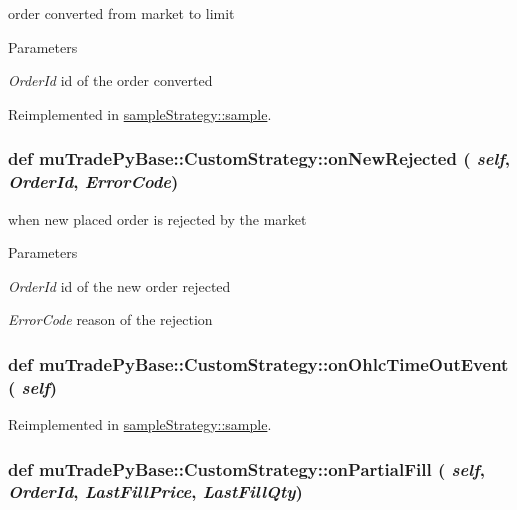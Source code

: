 order converted from market to limit 
\begin{DoxyParams}{Parameters}
\item[{\em OrderId}]id of the order converted \end{DoxyParams}


Reimplemented in \hyperlink{classsampleStrategy_1_1sample_a0dadfb1a2a74b910362bfeb1d5564185}{sampleStrategy::sample}.\hypertarget{classmuTradePyBase_1_1CustomStrategy_a5274ec9bdcddf755f17f2fc0817e4e19}{
\subsubsection[{onNewRejected}]{\setlength{\rightskip}{0pt plus 5cm}def muTradePyBase::CustomStrategy::onNewRejected ( {\em self}, \/   {\em OrderId}, \/   {\em ErrorCode})}}
\label{classmuTradePyBase_1_1CustomStrategy_a5274ec9bdcddf755f17f2fc0817e4e19}


when new placed order is rejected by the market 
\begin{DoxyParams}{Parameters}
\item[{\em OrderId}]id of the new order rejected \item[{\em ErrorCode}]reason of the rejection \end{DoxyParams}
\hypertarget{classmuTradePyBase_1_1CustomStrategy_aa94a2228807baeaab027108dc663675e}{
\subsubsection[{onOhlcTimeOutEvent}]{\setlength{\rightskip}{0pt plus 5cm}def muTradePyBase::CustomStrategy::onOhlcTimeOutEvent ( {\em self})}}
\label{classmuTradePyBase_1_1CustomStrategy_aa94a2228807baeaab027108dc663675e}
\begin{DoxyVerb}
\end{DoxyVerb}
 

Reimplemented in \hyperlink{classsampleStrategy_1_1sample_ab8d041be41bfa4e69b0a4953fc81458b}{sampleStrategy::sample}.\hypertarget{classmuTradePyBase_1_1CustomStrategy_a5d2894514fc731a0298c2139435dbd20}{
\subsubsection[{onPartialFill}]{\setlength{\rightskip}{0pt plus 5cm}def muTradePyBase::CustomStrategy::onPartialFill ( {\em self}, \/   {\em OrderId}, \/   {\em LastFillPrice}, \/   {\em LastFillQty})}}
\label{classmuTradePyBase_1_1CustomStrategy_a5d2894514fc731a0298c2139435dbd20}


